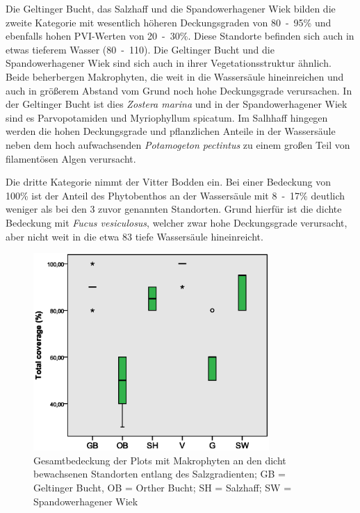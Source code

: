 Die Geltinger Bucht, das Salzhaff und die Spandowerhagener Wiek bilden die zweite Kategorie mit wesentlich höheren Deckungsgraden von \unit{80-95}{\%} und ebenfalls hohen PVI-Werten von \unit{20-30}{\%}. Diese Standorte befinden sich auch in etwas tieferem Wasser (\unit{80-110}{\centi\metre}). Die Geltinger Bucht und die Spandowerhagener Wiek sind sich auch in ihrer Vegetationsstruktur ähnlich. Beide beherbergen Makrophyten, die weit in die Wassersäule hineinreichen und auch in größerem Abstand vom Grund noch hohe Deckungsgrade verursachen. In der Geltinger Bucht ist dies \textit{Zostera marina} und in der Spandowerhagener Wiek sind es Parvopotamiden und Myriophyllum spicatum. Im Salhhaff hingegen werden die hohen Deckungsgrade und pflanzlichen Anteile in der Wassersäule neben dem hoch aufwachsenden \textit{Potamogeton pectintus} zu einem großen Teil von filamentösen Algen verursacht.

Die dritte Kategorie nimmt der Vitter Bodden ein. Bei einer Bedeckung von \unit{100}{\%} ist der Anteil des Phytobenthos an der Wassersäule mit \unit{8-17}{\%} deutlich weniger als bei den 3 zuvor genannten Standorten. Grund hierfür ist die dichte Bedeckung mit \textit{Fucus vesiculosus}, welcher zwar hohe Deckungsgrade verursacht, aber nicht weit in die etwa \unit{83}{\centi\metre} tiefe Wassersäule hineinreicht.



\begin{figure}[!htb]
\centering
\includegraphics[width=0.80\textwidth]{images/total_cover/cover_salzgradient.eps}
\caption[Bedeckung mit Makrophyten an Standorten entlang des Salzgradienten]{Gesamtbedeckung der Plots mit Makrophyten an den dicht bewachsenen Standorten entlang des Salzgradienten; GB = Geltinger Bucht, OB = Orther Bucht; SH = Salzhaff; SW = Spandowerhagener Wiek}
\label{fig:cover_salzgradient}
\end{figure}

